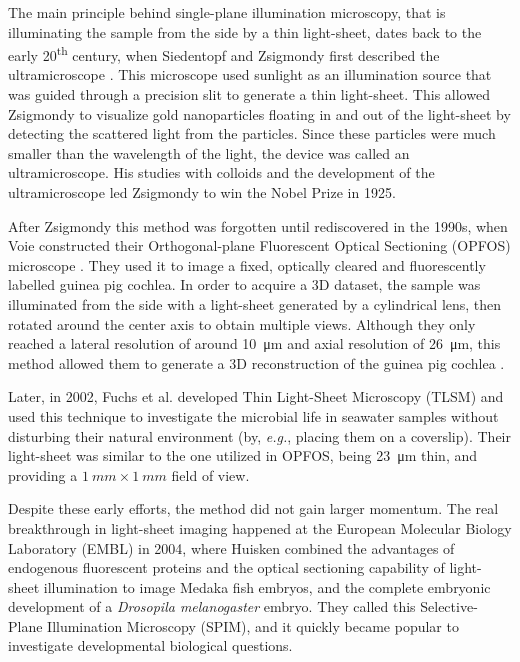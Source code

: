   

  The main principle behind single-plane illumination microscopy, that is illuminating the sample from the side by a thin light-sheet, dates back to the early 20\textsuperscript{th} century, when Siedentopf and Zsigmondy first described the ultramicroscope \cite{siedentopf_uber_1902}. This microscope used sunlight as an illumination source that was guided through a precision slit to generate a thin light-sheet. This allowed Zsigmondy to visualize gold nanoparticles floating in and out of the light-sheet by detecting the scattered light from the particles.
  Since these particles were much smaller than the wavelength of the light, the device was called an ultramicroscope. His studies with colloids and the development of the ultramicroscope led Zsigmondy to win the Nobel Prize in 1925.

  After Zsigmondy this method was forgotten until rediscovered in the 1990s, when Voie \etal constructed their Orthogonal-plane Fluorescent Optical Sectioning (OPFOS) microscope \cite{voie_orthogonal-plane_1993}. They used it to image a fixed, optically cleared and fluorescently labelled guinea pig cochlea. In order to acquire a 3D dataset, the sample was illuminated from the side with a light-sheet generated by a cylindrical lens, then rotated around the center axis to obtain multiple views. Although they only reached a lateral resolution of around \SI{10}{\micro m} and axial resolution of \SI{26}{\micro m}, this method allowed them to generate a 3D reconstruction of the guinea pig cochlea \cite{voie_three-dimensional_1995}.

  Later, in 2002, Fuchs et al. developed Thin Light-Sheet Microscopy (TLSM) \cite{fuchs_thin_2002} and used this technique to investigate the microbial life in seawater samples without disturbing their natural environment (by, \textit{e.g.}, placing them on a coverslip). Their light-sheet was similar to the one utilized in OPFOS, being \SI{23}{\micro m} thin, and providing a $\SI{1}{mm} \times \SI{1}{mm}$ field of view.

  Despite these early efforts, the method did not gain larger momentum. The real breakthrough in light-sheet imaging happened at the European Molecular Biology Laboratory (EMBL) in 2004, where Huisken \etal \cite{huisken_optical_2004} combined the advantages of endogenous fluorescent proteins and the optical sectioning capability of light-sheet illumination to image Medaka fish embryos, and the complete embryonic development of a \textit{Drosopila melanogaster} embryo. They called this Selective-Plane Illumination Microscopy (SPIM), and it quickly became popular to investigate developmental biological questions.

